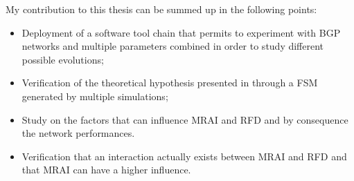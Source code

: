 My contribution to this thesis can be summed up in the following points:
\begin{itemize}
		\item Deployment of a software tool chain that permits to experiment
		with \ac{BGP} networks and multiple parameters combined in order to study
		different possible evolutions;
		\item Verification of the theoretical hypothesis presented in
		\cite{griffinFSM,fabrikant2011there} through a \ac{FSM} generated by
		multiple simulations;
		\item Study on the factors that can influence \ac{MRAI} and \ac{RFD} and
		by consequence the network performances.
		\item Verification that an interaction actually exists between \ac{MRAI}
		and \ac{RFD} and that \ac{MRAI} can have a higher influence.
\end{itemize}
